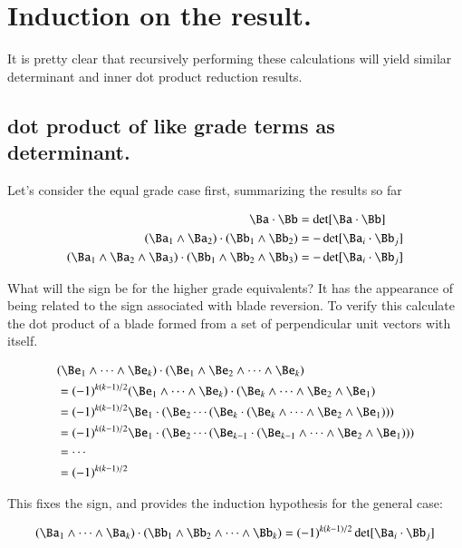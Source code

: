 \section{Induction on the result. }

It is pretty clear that recursively performing these calculations will yield similar determinant and inner dot product reduction
results.

\subsection{dot product of like grade terms as determinant. }

Let's consider the equal grade case first, summarizing the results so far

\begin{align*}
\Ba \cdot \Bb &= \det[\Ba \cdot \Bb] \\
(\Ba_1 \wedge \Ba_2) \cdot (\Bb_1 \wedge \Bb_2) &= -\det[\Ba_i \cdot \Bb_j] \\
(\Ba_1 \wedge \Ba_2 \wedge \Ba_3) \cdot (\Bb_1 \wedge \Bb_2 \wedge \Bb_3) &= -\det[\Ba_i \cdot \Bb_j] \\
\end{align*}

What will the sign be for the higher grade equivalents?  It has the appearance of being related to the sign associated with blade
reversion.  To verify this calculate the dot product of a blade formed from a set of perpendicular unit vectors with itself.

\begin{align*}
&(\Be_1 \wedge \cdots \wedge \Be_k) \cdot (\Be_1 \wedge \Be_2 \wedge \cdots \wedge \Be_k) \\
&= (-1)^{k(k-1)/2}(\Be_1 \wedge \cdots \wedge \Be_k) \cdot (\Be_k \wedge \cdots \wedge \Be_2 \wedge \Be_1) \\
&= (-1)^{k(k-1)/2}\Be_1 \cdot (\Be_2 \cdots (\Be_k \cdot (\Be_k \wedge \cdots \wedge \Be_2 \wedge \Be_1))) \\
&= (-1)^{k(k-1)/2}\Be_1 \cdot (\Be_2 \cdots (\Be_{k-1} \cdot (\Be_{k-1} \wedge \cdots \wedge \Be_2 \wedge \Be_1))) \\
&= \cdots \\
&= (-1)^{k(k-1)/2}
\end{align*}

This fixes the sign, and provides the induction hypothesis for the general case:

\begin{equation}\label{eqn:bladegradereduction:bladedothyp}
(\Ba_1 \wedge \cdots \wedge \Ba_k) \cdot (\Bb_1 \wedge \Bb_2 \wedge \cdots \wedge \Bb_k) = (-1)^{k(k-1)/2}\det[\Ba_i \cdot \Bb_j]
\end{equation}

